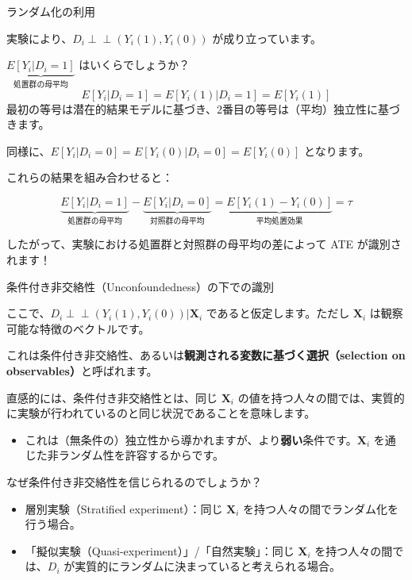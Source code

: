\documentclass[11pt,handout]{beamer}
\newenvironment{wideitemize}{\itemize\addtolength{\itemsep}{10pt}}{\enditemize}
\newcommand{\indep}{\perp\!\!\!\!\perp}
\begin{document}
\begin{frame}{ランダム化の利用}
\vspace{0.2cm}
\begin{wideitemize}
\item
実験により、$D_i \indep (Y_i(1),Y_i(0))$ が成り立っています。

\item
$\underbrace{E[Y_i | D_i = 1]}_{\text{処置群の母平均}}$ はいくらでしょうか？
\vspace{.3cm}
\pause
$$	E[Y_i|D_i=1] = E[Y_i(1) | D_i = 1] = E[Y_i(1)]$$
\noindent 最初の等号は潜在的結果モデルに基づき、2番目の等号は（平均）独立性に基づきます。

\pause
\item
同様に、$E[Y_i | D_i = 0] =  E[Y_i(0) | D_i = 0] = E[Y_i(0)]$ となります。

\pause
\item
これらの結果を組み合わせると：
\vspace{-0.2cm}

$$\underbrace{E[Y_i | D_i = 1]}_{\text{処置群の母平均}} - \underbrace{E[Y_i | D_i = 0]}_{\text{対照群の母平均}} = \underbrace{E[Y_i(1) - Y_i(0)]}_{\text{平均処置効果}} = \tau$$

したがって、実験における処置群と対照群の母平均の差によって ATE が識別されます！
\end{wideitemize}
\end{frame}

\begin{frame}{条件付き非交絡性（Unconfoundedness）の下での識別}
	\begin{wideitemize}
		\item
		ここで、$D_i \indep (Y_i(1), Y_i(0)) | \mathbf{X}_i$ であると仮定します。ただし $\mathbf{X}_i$ は観察可能な特徴のベクトルです。
		
		\item
		これは条件付き非交絡性、あるいは\textbf{観測される変数に基づく選択（selection on observables）}と呼ばれます。
		
		\pause
		\item
		直感的には、条件付き非交絡性とは、同じ $\mathbf{X}_i$ の値を持つ人々の間では、実質的に実験が行われているのと同じ状況であることを意味します。
\begin{itemize}
\item これは（無条件の）独立性から導かれますが、より\textbf{弱い}条件です。$\mathbf{X}_i$ を通じた非ランダム性を許容するからです。
\end{itemize}
		
		\pause
		\item 
		なぜ条件付き非交絡性を信じられるのでしょうか？
		\begin{itemize}
			\item 
			層別実験（Stratified experiment）：同じ $\mathbf{X}_i$ を持つ人々の間でランダム化を行う場合。
			
			\medskip
			\pause
			\item
			「擬似実験（Quasi-experiment）」/「自然実験」：同じ $\mathbf{X}_i$ を持つ人々の間では、$D_i$ が実質的にランダムに決まっていると考えられる場合。
		\end{itemize}
	\end{wideitemize}
\end{frame}
\end{document}
